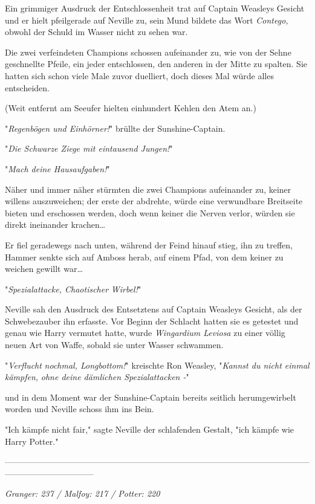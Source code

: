 {Ein grimmiger Ausdruck der Entschlossenheit trat auf Captain Weasleys Gesicht und er hielt pfeilgerade auf Neville zu, sein Mund bildete das Wort \emph{Contego,} obwohl der Schuld im Wasser nicht zu sehen war.

Die zwei verfeindeten Champions schossen aufeinander zu, wie von der Sehne geschnellte Pfeile, ein jeder entschlossen, den anderen in der Mitte zu spalten. Sie hatten sich schon viele Male zuvor duelliert, doch dieses Mal würde alles entscheiden.

(Weit entfernt am Seeufer hielten einhundert Kehlen den Atem an.)

"\emph{Regenbögen und Einhörner!}" brüllte der Sunshine-Captain.

"\emph{Die Schwarze Ziege mit eintausend Jungen!}"

"\emph{Mach deine Hausaufgaben!}"

Näher und immer näher stürmten die zwei Champions aufeinander zu, keiner willens auszuweichen; der erste der abdrehte, würde eine verwundbare Breitseite bieten und erschossen werden, doch wenn keiner die Nerven verlor, würden sie direkt ineinander krachen…

Er fiel geradewegs nach unten, während der Feind hinauf stieg, ihn zu treffen, Hammer senkte sich auf Amboss herab, auf einem Pfad, von dem keiner zu weichen gewillt war…

"\emph{Spezialattacke, Chaotischer} \emph{Wirbel!}"

Neville sah den Ausdruck des Entsetztens auf Captain Weasleys Gesicht, als der Schwebezauber ihn erfasste. Vor Beginn der Schlacht hatten sie es getestet und genau wie Harry vermutet hatte, wurde \emph{Wingardium Leviosa} zu einer völlig neuen Art von Waffe, sobald sie unter Wasser schwammen.

"\emph{Verflucht} \emph{nochmal, Longbottom!}" kreischte Ron Weasley, "\emph{Kannst du nicht einmal} \emph{kämpfen,} \emph{ohne deine dämlichen Spezialattacken -}"

und in dem Moment war der Sunshine-Captain bereits seitlich herumgewirbelt worden und Neville schoss ihm ins Bein.

"Ich kämpfe nicht fair," sagte Neville der schlafenden Gestalt, "ich kämpfe wie Harry Potter."

--------------------------------------------------------------------------------------------------------------------------------------------

\emph{Granger: 237 / Malfoy: 217 / Potter: 220}

}
